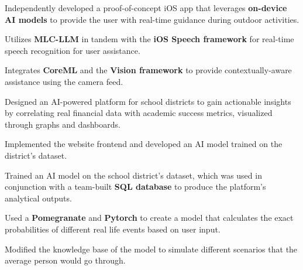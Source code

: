 \documentclass[letterpaper,10pt]{article}
\begin{document}
  \vspace{0pt}
  \begin{resume_list}
    \vspace{1pt}
    \item Independently developed a proof-of-concept iOS app that leverages \textbf{on-device AI models} to provide the user with real-time guidance during outdoor activities.
    \vspace{1pt}
    \item Utilizes \textbf{MLC-LLM} in tandem with the \textbf{iOS Speech framework} for real-time speech recognition for user assistance.
    \vspace{1pt}
    \item Integrates \textbf{CoreML} and the \textbf{Vision framework} to provide contextually-aware assistance using the camera feed.
  \end{resume_list}

  \vspace{0pt}
  \begin{resume_list}
    \vspace{2pt}
    \item Designed an AI-powered platform for school districts to gain actionable insights by correlating real financial data with academic success metrics, visualized through graphs and dashboards.
    \vspace{1pt}
    \item Implemented the website frontend and developed an AI model trained on the district's dataset.
    \item Trained an AI model on the school district's dataset, which was used in conjunction with a team-built \textbf{SQL database} to produce the platform's analytical outputs.
  \end{resume_list}

  \vspace{0pt}
  \begin{resume_list}
    \vspace{2pt}
    \item Used a \textbf{Pomegranate} and \textbf{Pytorch} to create a model that calculates the exact probabilities of different real life events based on user input.
    \vspace{1pt}
    \item Modified the knowledge base of the model to simulate different scenarios that the average person would go through.
  \end{resume_list}
\end{document}
